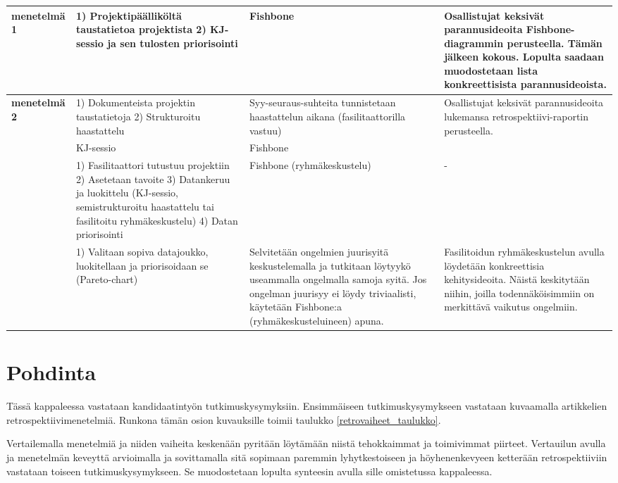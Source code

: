 \begin{center}
\begin{longtable}{|p{3cm}|p{4cm}|p{4cm}|p{4cm}|}
	\textbf{\citep{staalhane2003post} menetelmä 1} & 1) Projektipäälliköltä taustatietoa projektista 2) KJ-sessio ja sen tulosten priorisointi & Fishbone & Osallistujat keksivät parannusideoita Fishbone-diagrammin perusteella. Tämän jälkeen kokous. Lopulta saadaan muodostetaan lista konkreettisista parannusideoista. \\ \hline
	\textbf{\citep{staalhane2003post} menetelmä 2} & 1) Dokumenteista projektin taustatietoja 2) Strukturoitu haastattelu & Syy-seuraus-suhteita tunnistetaan haastattelun aikana (fasilitaattorilla vastuu) & Osallistujat keksivät parannusideoita lukemansa retrospektiivi-raportin perusteella. \\ \hline
	\textbf{\citep{dingsoyr2003extending}} & KJ-sessio & Fishbone &  \\ \hline
	\textbf{\citep{birk2002postmortem}} & 1) Fasilitaattori tutustuu projektiin 2) Asetetaan tavoite 3) Datankeruu ja luokittelu (KJ-sessio,  semistrukturoitu haastattelu tai fasilitoitu ryhmäkeskustelu) 4) Datan priorisointi & Fishbone (ryhmäkeskustelu) & - \\ \hline
	\textbf{\citep{card1998learning}} & 1) Valitaan sopiva datajoukko, luokitellaan ja priorisoidaan se (Pareto-chart) & Selvitetään ongelmien juurisyitä keskustelemalla ja tutkitaan löytyykö useammalla ongelmalla samoja syitä. Jos ongelman juurisyy ei löydy triviaalisti, käytetään Fishbone:a (ryhmäkeskusteluineen) apuna. & Fasilitoidun ryhmäkeskustelun avulla löydetään konkreettisia kehitysideoita. Näistä keskitytään niihin, joilla todennäköisimmiin on merkittävä vaikutus ongelmiin. \\ \hline
\end{longtable}
\end{center}

\section{Pohdinta}
Tässä kappaleessa vastataan kandidaatintyön tutkimuskysymyksiin. Ensimmäiseen tutkimuskysymykseen vastataan kuvaamalla artikkelien retrospektiivimenetelmiä. Runkona tämän osion kuvauksille toimii taulukko \ref{retrovaiheet_taulukko}.

Vertailemalla menetelmiä ja niiden vaiheita keskenään pyritään löytämään niistä tehokkaimmat ja toimivimmat piirteet. 
Vertauilun avulla ja menetelmän keveyttä arvioimalla ja sovittamalla sitä sopimaan paremmin lyhytkestoiseen ja höyhenenkevyeen ketterään retrospektiiviin vastataan toiseen tutkimuskysymykseen. Se muodostetaan lopulta synteesin avulla sille omistetussa kappaleessa. 

